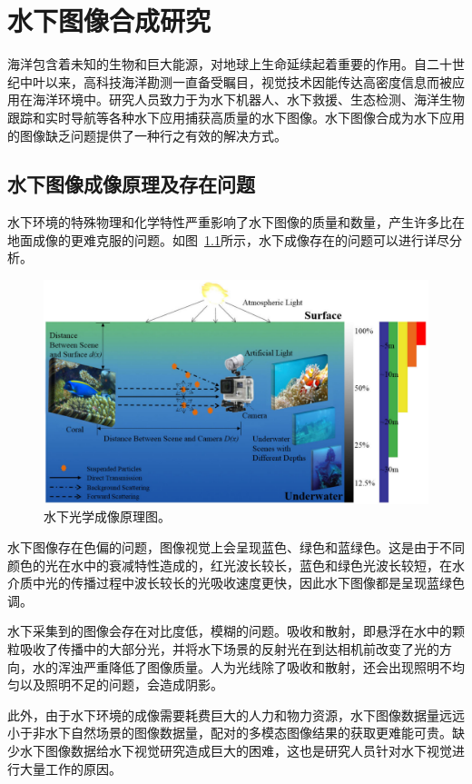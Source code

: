 \chapter{水下图像合成研究}
海洋包含着未知的生物和巨大能源，对地球上生命延续起着重要的作用。自二十世纪中叶以来，高科技海洋勘测一直备受瞩目，视觉技术因能传达高密度信息而被应用在海洋环境中。研究人员致力于为水下机器人、水下救援、生态检测、海洋生物跟踪和实时导航等各种水下应用捕获高质量的水下图像。水下图像合成为水下应用的图像缺乏问题提供了一种行之有效的解决方式。

\section{水下图像成像原理及存在问题}
水下环境的特殊物理和化学特性严重影响了水下图像的质量和数量，产生许多比在地面成像的更难克服的问题。如图~\ref{fig:underwater}所示，水下成像存在的问题可以进行详尽分析。

\begin{figure}[ht]
    \centering
	\includegraphics[width=\textwidth]{figures/水下成像.pdf}
	\caption{水下光学成像原理图。}
	\label{fig:underwater}
\end{figure}

水下图像存在色偏的问题，图像视觉上会呈现蓝色、绿色和蓝绿色。这是由于不同颜色的光在水中的衰减特性造成的，红光波长较长，蓝色和绿色光波长较短，在水介质中光的传播过程中波长较长的光吸收速度更快，因此水下图像都是呈现蓝绿色调。

水下采集到的图像会存在对比度低，模糊的问题。吸收和散射，即悬浮在水中的颗粒吸收了传播中的大部分光，并将水下场景的反射光在到达相机前改变了光的方向，水的浑浊严重降低了图像质量。人为光线除了吸收和散射，还会出现照明不均匀以及照明不足的问题，会造成阴影。


此外，由于水下环境的成像需要耗费巨大的人力和物力资源，水下图像数据量远远小于非水下自然场景的图像数据量，配对的多模态图像结果的获取更难能可贵。缺少水下图像数据给水下视觉研究造成巨大的困难，这也是研究人员针对水下视觉进行大量工作的原因。

